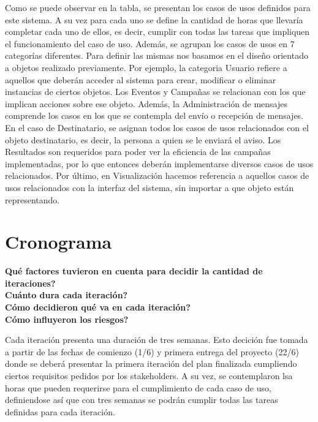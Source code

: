 \documentclass[a4paper, 11pt]{article}
\begin{document}
Como se puede observar en la tabla, se presentan los casos de usos definidos para este sistema. A su vez para cada uno se define la cantidad de horas que llevaría completar cada uno de ellos, es decir, cumplir con todas las tareas que impliquen el funcionamiento del caso de uso. Además, se agrupan los casos de usos en 7 categorías diferentes. Para definir las mismas nos basamos en el diseño orientado a objetos realizado previamente. Por ejemplo, la categoria Usuario refiere a aquellos que deberán acceder al sistema para crear, modificar o eliminar instancias de ciertos objetos. Los Eventos y Campañas se relacionan con los que implican acciones sobre ese objeto. Además, la Administración de mensajes comprende los casos en los que se contempla del envío o recepción de mensajes. 
En el caso de Destinatario, se asignan todos los casos de usos relacionados con el objeto destinatario, es decir, la persona a quien se le enviará el aviso. Los Resultados son requeridos para poder ver la eficiencia de las campañas implementadas, por lo que entonces deberán implementarse diversos casos de usos relacionados. 
Por último, en Visualización hacemos referencia a aquellos casos de usos relacionados con la interfaz del sistema, sin importar a que objeto están representando. 


\newpage

\section{Cronograma}
\textbf{Qué factores tuvieron en cuenta para decidir la cantidad de iteraciones?\\
Cuánto dura cada iteración? \\
Cómo decidieron qué va en cada iteración?\\
Cómo influyeron los riesgos?}

Cada iteración presenta una duración de tres semanas. Esto decición fue tomada a partir de las fechas de comienzo (1/6) y primera entrega del proyecto (22/6) donde se deberá presentar la primera iteración del plan finalizada cumpliendo ciertos requisitos pedidos por los stakeholders. A su vez, se contemplaron lsa horas que pueden requerirse para el cumplimiento de cada caso de uso, definiendose así que con tres semanas se podrán cumplir todas las tareas definidas para cada iteración.
\end{document}
